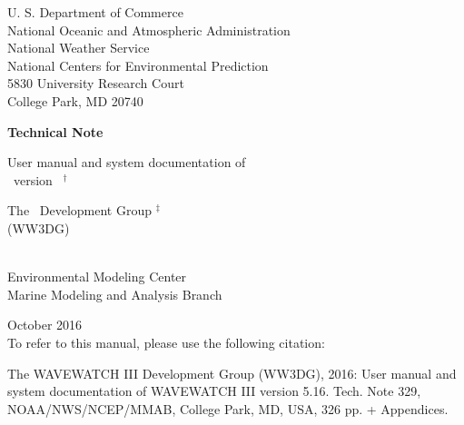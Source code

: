 
\pagestyle{empty}

\begin{center} 
U. S. Department of Commerce \\
National Oceanic and Atmospheric Administration \\
National Weather Service \\
National Centers for Environmental Prediction \\
5830 University Research Court \\
College Park, MD 20740


\vspace{15mm}

{\bf Technical Note}

\vspace{15mm}

{\large User manual and system documentation of \\
\ww\ version \WWver\ $^\dag$} \\

\vspace{15mm}

The \ww\ Development Group $^\ddag$ \\
(WW3DG)\\
\strut \\
Environmental Modeling Center \\
Marine Modeling and Analysis Branch

\vfill

 October 2016 \\
\vspace{\baselineskip}
{\sc To refer to this manual, please use the following citation:} \\
\end{center}
\noindent The WAVEWATCH III\textsuperscript{\textregistered} Development Group (WW3DG), 2016: User manual and system documentation of  WAVEWATCH III\textsuperscript{\textregistered} version 5.16. Tech. Note 329, NOAA/NWS/NCEP/MMAB, College Park, MD, USA, 326 pp. + Appendices. 

